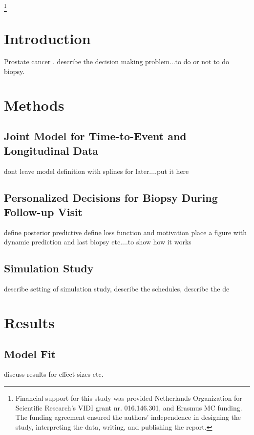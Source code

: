\documentclass[Afour,sagev,times]{sagej}
\begin{document}

\maketitle

\footnote{Financial support for this study was provided Netherlands Organization for Scientific Research's VIDI grant nr. 016.146.301, and Erasmus MC funding. The funding agreement ensured the authors’ independence in designing the study, interpreting the data, writing, and publishing the report.}
\thefootnote

\section{Introduction}
Prostate cancer \cite{bokhorst2015compliance}.
describe the decision making problem...to do or not to do biopsy.


\section{Methods}
\subsection{Joint Model for Time-to-Event and Longitudinal Data}
dont leave model definition with splines for later....put it here

\subsection{Personalized Decisions for Biopsy During Follow-up Visit}
define posterior predictive
define loss function and motivation
place a figure with dynamic prediction and last biopsy etc....to show how it works

\subsection{Simulation Study}
describe setting of simulation study, describe the schedules, describe the de

\section{Results}

\subsection{Model Fit}
discuss results for effect sizes etc.
\end{document}
